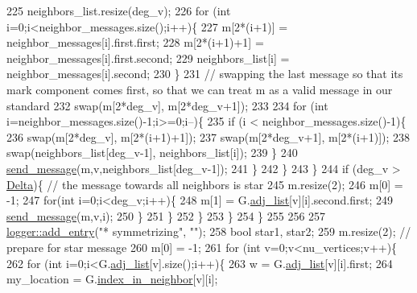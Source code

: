 \begin{DoxyCode}
225             neighbors\_list.resize(deg\_v);
226             \textcolor{keywordflow}{for} (\textcolor{keywordtype}{int} i=0;i<neighbor\_messages.size();i++)\{
227               m[2*(i+1)]   = neighbor\_messages[i].first.first;
228               m[2*(i+1)+1] = neighbor\_messages[i].first.second;
229               neighbors\_list[i] = neighbor\_messages[i].second;
230             \}
231             \textcolor{comment}{// swapping the last message so that its mark component comes first, so that we can treat m as
       a valid message in our standard}
232             swap(m[2*deg\_v], m[2*deg\_v+1]);
233 
234             \textcolor{keywordflow}{for} (\textcolor{keywordtype}{int} i=neighbor\_messages.size()-1;i>=0;i--)\{
235               \textcolor{keywordflow}{if} (i < neighbor\_messages.size()-1)\{
236                 swap(m[2*deg\_v], m[2*(i+1)+1]);
237                 swap(m[2*deg\_v+1], m[2*(i+1)]);
238                 swap(neighbors\_list[deg\_v-1], neighbors\_list[i]);
239               \}
240               \hyperlink{classgraph__message_aa76d1d5420a12477fa1dddd878d78c8f}{send\_message}(m,v,neighbors\_list[deg\_v-1]);
241             \}
242           \}
243         \}
244         \textcolor{keywordflow}{if} (deg\_v > \hyperlink{classgraph__message_a45dfd061b7bc73572e5132fbf66efd55}{Delta})\{ \textcolor{comment}{// the message towards all neighbors is star}
245           m.resize(2);
246           m[0] = -1;
247           \textcolor{keywordflow}{for}(\textcolor{keywordtype}{int} i=0;i<deg\_v;i++)\{
248             m[1] = G.\hyperlink{classmarked__graph_a1a0bf7ca413a278763f7c878b3b6fd6f}{adj\_list}[v][i].second.first;
249             \hyperlink{classgraph__message_aa76d1d5420a12477fa1dddd878d78c8f}{send\_message}(m,v,i);
250           \}
251         \}
252       \}
253     \}
254   \}
255 
256 
257   \hyperlink{classlogger_a710163deb17bc81f70d53d285b8ac9ac}{logger::add\_entry}(\textcolor{stringliteral}{"* symmetrizing"}, \textcolor{stringliteral}{""});
258   \textcolor{keywordtype}{bool} star1, star2;
259   m.resize(2); \textcolor{comment}{// prepare for star message}
260   m[0] = -1;
261   \textcolor{keywordflow}{for} (\textcolor{keywordtype}{int} v=0;v<nu\_vertices;v++)\{
262     \textcolor{keywordflow}{for} (\textcolor{keywordtype}{int} i=0;i<G.\hyperlink{classmarked__graph_a1a0bf7ca413a278763f7c878b3b6fd6f}{adj\_list}[v].size();i++)\{
263       w = G.\hyperlink{classmarked__graph_a1a0bf7ca413a278763f7c878b3b6fd6f}{adj\_list}[v][i].first;
264       my\_location = G.\hyperlink{classmarked__graph_aee10b537408de42476609c1e45c075d0}{index\_in\_neighbor}[v][i];

\end{DoxyCode}
